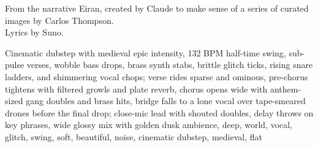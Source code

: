 
\begin{notes}
From the narrative Eiran, created by Claude to make sense of a series of curated images by Carlos Thompson.\\
Lyrics by Suno.
\end{notes}
\begin{style}
Cinematic dubstep with medieval epic intensity, 132 BPM half-time swing, sub-pulse verses, wobble bass drops, brass synth stabs, brittle glitch ticks, rising snare ladders, and shimmering vocal chops; verse rides sparse and ominous, pre-chorus tightens with filtered growls and plate reverb, chorus opens wide with anthem-sized gang doubles and brass hits, bridge falls to a lone vocal over tape-smeared drones before the final drop; close-mic lead with shouted doubles, delay throws on key phrases, wide glossy mix with golden dusk ambience, deep, world, vocal, glitch, swing, soft, beautiful, noise, cinematic dubstep, medieval, flat
\end{style}
